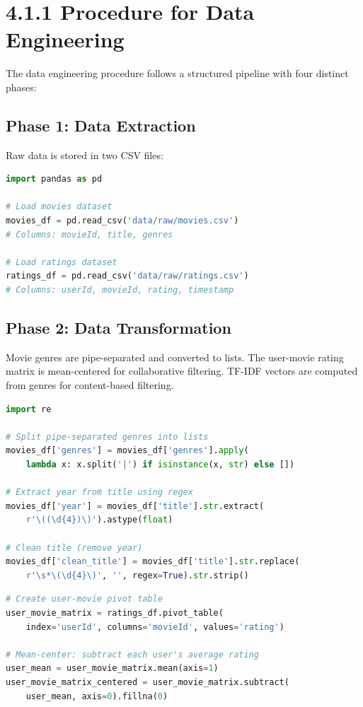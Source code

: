 \documentclass[12pt,a4paper]{report}
\begin{document}
\section{4.1.1 Procedure for Data Engineering}

The data engineering procedure follows a structured pipeline with four distinct phases:

\subsection{Phase 1: Data Extraction}

Raw data is stored in two CSV files:

\begin{lstlisting}[language=Python, caption={Loading Raw Data}]
import pandas as pd

# Load movies dataset
movies_df = pd.read_csv('data/raw/movies.csv')
# Columns: movieId, title, genres

# Load ratings dataset
ratings_df = pd.read_csv('data/raw/ratings.csv')
# Columns: userId, movieId, rating, timestamp
\end{lstlisting}

\subsection{Phase 2: Data Transformation}

Movie genres are pipe-separated and converted to lists. The user-movie rating matrix is mean-centered for collaborative filtering. TF-IDF vectors are computed from genres for content-based filtering.

\begin{lstlisting}[language=Python, caption={Genre Parsing and Year Extraction}]
import re

# Split pipe-separated genres into lists
movies_df['genres'] = movies_df['genres'].apply(
    lambda x: x.split('|') if isinstance(x, str) else [])

# Extract year from title using regex
movies_df['year'] = movies_df['title'].str.extract(
    r'\((\d{4})\)').astype(float)

# Clean title (remove year)
movies_df['clean_title'] = movies_df['title'].str.replace(
    r'\s*\(\d{4}\)', '', regex=True).str.strip()
\end{lstlisting}

\begin{lstlisting}[language=Python, caption={User-Movie Rating Matrix Construction}]
# Create user-movie pivot table
user_movie_matrix = ratings_df.pivot_table(
    index='userId', columns='movieId', values='rating')

# Mean-center: subtract each user's average rating
user_mean = user_movie_matrix.mean(axis=1)
user_movie_matrix_centered = user_movie_matrix.subtract(
    user_mean, axis=0).fillna(0)
\end{lstlisting}
\end{document}
